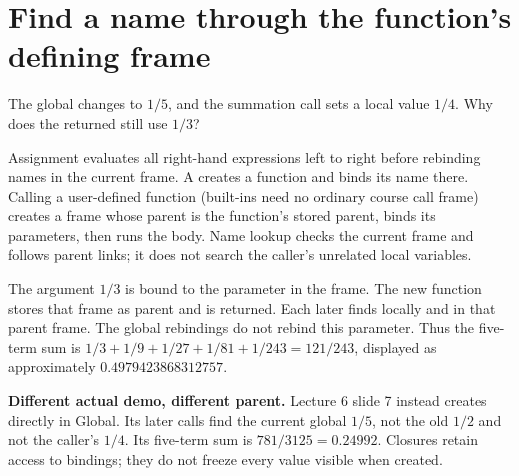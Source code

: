 \documentclass[10pt]{scrartcl}
\begin{document}
\section{Find a name through the function's defining frame}
\begin{qbox}
The global  changes to $1/5$, and the summation call sets a local value $1/4$. Why does the returned  still use $1/3$?
\end{qbox}
\begin{proposition*}
Assignment evaluates all right-hand expressions left to right before rebinding names in the current frame. A  creates a function and binds its name there. Calling a user-defined function (built-ins need no ordinary course call frame) creates a frame whose parent is the function's stored parent, binds its parameters, then runs the body. Name lookup checks the current frame and follows parent links; it does not search the caller's unrelated local variables.
\end{proposition*}
\begin{fig}
\end{fig}
\par\noindent\begin{minipage}{\linewidth}
\begin{steps}
\ii The argument $1/3$ is bound to the parameter in the  frame. The new  function stores that frame as parent and is returned.
\ii Each later  finds  locally and  in that parent frame. The global rebindings do not rebind this parameter.
\ii Thus the five-term sum is $1/3+1/9+1/27+1/81+1/243=121/243$, displayed as approximately $0.4979423868312757$.
\end{steps}
\end{minipage}\par
\textbf{Different actual demo, different parent.} Lecture 6 slide 7 instead creates  directly in Global. Its later calls find the current global $1/5$, not the old $1/2$ and not the caller's $1/4$. Its five-term sum is $781/3125=0.24992$. Closures retain access to bindings; they do not freeze every value visible when created.
\end{document}
